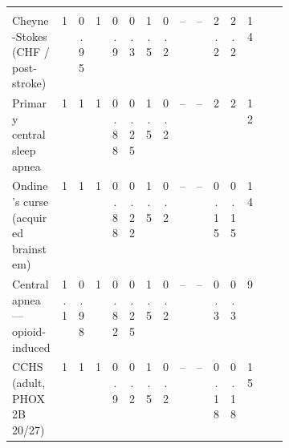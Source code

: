{\begin{longtable}{@{}>{\raggedright\arraybackslash}p{0.27\linewidth}cccccccccccc>{\raggedright\arraybackslash}p{0.13\linewidth}@{}}
\multicolumn{14}{@{}l}{\textit{Central hypoventilation}}\\
Cheyne-Stokes (CHF / post-stroke) & 1 & 0.95 & 1 & 0.9 & 0.3 & 1.5 & 0.2 & -- & -- & 2.2 & 2.2 & 14 & \citep{bradley2003,naughton1993}\\
Primary central sleep apnea & 1 & 1 & 1 & 0.88 & 0.25 & 1.5 & 0.2 & -- & -- & 2 & 2 & 12 & \citep{bradley2003,dempsey2010}\\
Ondine's curse (acquired brainstem) & 1 & 1 & 1 & 0.88 & 0.22 & 1.5 & 0.2 & -- & -- & 0.15 & 0.15 & 14 & \citep{weesemayer2010,sarnat2004}\\
Central apnea --- opioid-induced & 1.1 & 0.98 & 1 & 0.82 & 0.25 & 1.5 & 0.2 & -- & -- & 0.3 & 0.3 & 9 & \citep{pattinson2008}\\
CCHS (adult, PHOX2B 20/27) & 1 & 1 & 1 & 0.9 & 0.2 & 1.5 & 0.2 & -- & -- & 0.18 & 0.18 & 15 & \citep{weesemayer2010,trang2005}\\
\end{longtable}}

